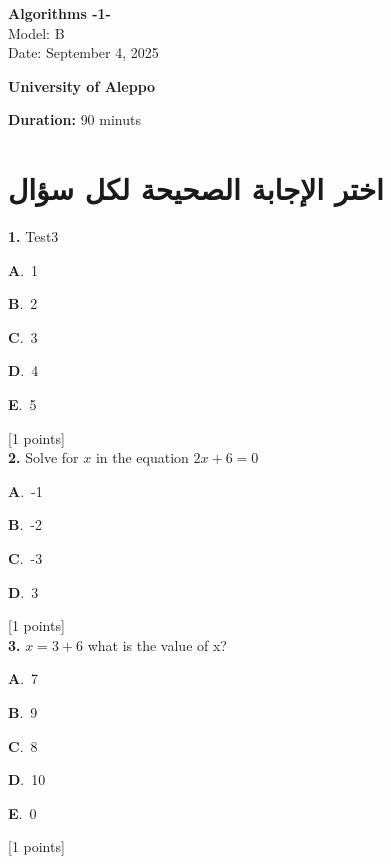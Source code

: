 \documentclass[12pt]{article}
\newcommand{\choice}[3]{%
  \noindent\textbf{#1}.~#2\hfill#3\par\vspace{0.25em}
}
\begin{document}
\begin{flushright}
{\Large \textbf{{\textenglish{Algorithms -1-}}}}\\[0.25em]
{\normalsize \textenglish{Model: }{\textenglish{B}}}\\[0.1em]
{\normalsize \textenglish{Date: }{\textenglish{September 4, 2025}}}
\end{flushright}

\vspace{0.6cm}

\noindent
\begin{minipage}[t]{0.65\textwidth}
  \raggedright
  \textbf{{\textenglish{University of Aleppo}}}\\[0.3em]
\end{minipage}\hfill
\begin{minipage}[t]{0.3\textwidth}
  \raggedleft
  \textenglish{\textbf{Duration: }}{\textenglish{90 minuts}}
\end{minipage}

\vspace{0.9cm}

\section*{اختر الإجابة الصحيحة لكل سؤال}

\noindent \textbf{\textenglish{1.}} {\textenglish{Test3}}

\noindent\choice{A}{{\textenglish{1}}}{}
\noindent\choice{B}{{\textenglish{2}}}{}
\noindent\choice{C}{{\textenglish{3}}}{}
\noindent\choice{D}{{\textenglish{4}}}{}
\noindent\choice{E}{{\textenglish{5}}}{}
\hfill {\textenglish{[1 points]}}\\[0.5em]

\noindent \textbf{\textenglish{2.}} {\textenglish{Solve for }}\(x \){\textenglish{ in the equation }}\(2x+6 = 0 \)

\noindent\choice{A}{{\textenglish{-1}}}{}
\noindent\choice{B}{{\textenglish{-2}}}{}
\noindent\choice{C}{{\textenglish{-3}}}{}
\noindent\choice{D}{{\textenglish{3}}}{}
\hfill {\textenglish{[1 points]}}\\[0.5em]

\noindent \textbf{\textenglish{3.}} \(x=3+6 \){\textenglish{ what is the value of x?}}

\noindent\choice{A}{{\textenglish{7}}}{}
\noindent\choice{B}{{\textenglish{9}}}{}
\noindent\choice{C}{{\textenglish{8}}}{}
\noindent\choice{D}{{\textenglish{10}}}{}
\noindent\choice{E}{{\textenglish{0}}}{}
\hfill {\textenglish{[1 points]}}\\[0.5em]
\end{document}
